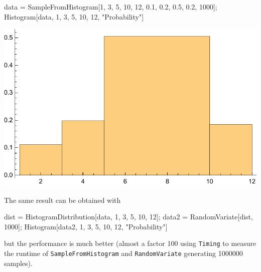 \documentclass{tstextbook}
\begin{document}
\begin{example}
\begin{mathematica}
data = SampleFromHistogram[{1, 3, 5, 10, 12},
                           {0.1, 0.2, 0.5, 0.2}, 
                           1000];
Histogram[data, {{1, 3, 5, 10, 12}}, "Probability"]    
\end{mathematica}
 \includegraphics[scale=0.9, center]{images/histogram_sampling.pdf}   

The same result can be obtained with
\begin{mathematica}
dist = HistogramDistribution[data, {{1, 3, 5, 10, 12}}];
data2 = RandomVariate[dist, 1000];
Histogram[data2, {{1, 3, 5, 10, 12}}, "Probability"]
\end{mathematica}
but the performance is much better (almost a factor 100 using \texttt{Timing} to measure the runtime of \texttt{SampleFromHistogram} and \texttt{RandomVariate} generating 1000000 samples). 
\end{example}
\end{document}
